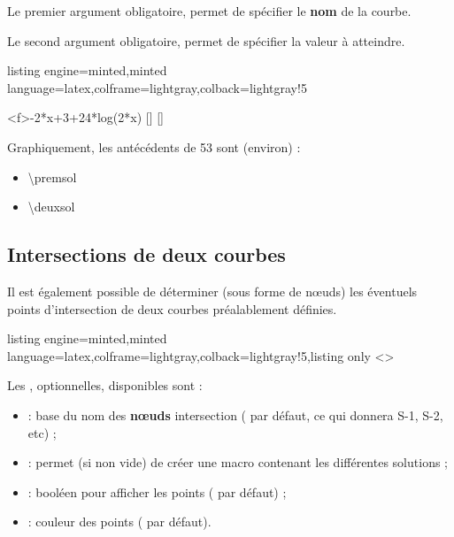 \documentclass[11pt,a4paper]{ltxdoc}
\begin{document}
\smallskip

Le premier argument obligatoire, permet de spécifier le \textbf{nom} de la courbe.

\smallskip

Le second argument obligatoire, permet de spécifier la valeur à atteindre.

\begin{tcblisting}{listing engine=minted,minted language=latex,colframe=lightgray,colback=lightgray!5}
\begin{GraphiqueTikz}%
  [x=0.9cm,y=0.425cm,Xmin=4,Xmax=20,Origx=4,
  Ymin=40,Ymax=56,Ygrille=2,Ygrilles=1,Origy=40]
  \DefinirCourbe[Nom=cf,Debut=5,Fin=19,Trace,Couleur=red]<f>{-2*x+3+24*log(2*x)}
  [\premsol]
  [\deuxsol]
\end{GraphiqueTikz}

Graphiquement, les antécédents de 53 sont (environ) :

\begin{itemize}
  \item \num{\premsol}
  \item \num{\deuxsol}
\end{itemize}
\end{tcblisting}

\pagebreak

\subsection{Intersections de deux courbes}\label{intersect}

Il est également possible de déterminer (sous forme de nœuds) les éventuels points d'intersection de deux courbes préalablement définies.

\begin{tcblisting}{listing engine=minted,minted language=latex,colframe=lightgray,colback=lightgray!5,listing only}
<\myt>
\end{tcblisting}

Les \MontreCode{[clés]}, optionnelles, disponibles sont :

\smallskip

\begin{itemize}
  \item {} : base du nom des \textbf{nœuds} intersection ( par défaut, ce qui donnera \textsf{S-1}, \textsf{S-2}, etc) ;
  \item {} : permet (si non vide) de créer une macro contenant les différentes solutions ;
  \item {} : booléen pour afficher les points ( par défaut) ;
  \item {} : couleur des points ( par défaut).
\end{itemize}
\end{document}
